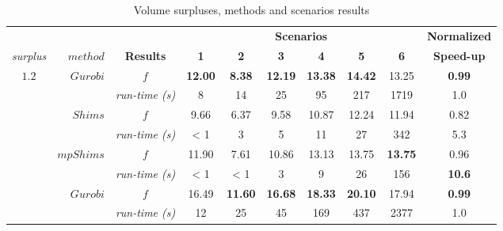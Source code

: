 \documentclass[preprint,authoryear]{elsarticle}
\begin{document}
\begin{table}[H]
\centering
\caption{Volume surpluses, methods and scenarios results}  \label{tab:results}
\footnotesize
\begin{tabular}{crcccccccc}
\toprule
&                          &                     &\multicolumn{6}{c}{\bf Scenarios}                                                                        &{\bf Normalized}\\
                                                 \cmidrule{4-9}		
{\it surplus}         & {$method$}               & {\bf Results}      &{\bf 1}      &{\bf 2}      &{\bf 3}      &{\bf 4}      &{\bf 5}       &{\bf 6}      &{\bf Speed-up} \\
\toprule


\multirow{7}{*}{$1.2$}&\multirow{2}{*}{ $Gurobi$}& $f$                & {\bf 12.00} & {\bf 8.38}  & {\bf 12.19} & {\bf 13.38} & {\bf 14.42} & 13.25        & {\bf 0.99} \\%
&                                                & {\it run-time (s)} &  8          &   14        &  25         &  95         &    217      &  1719        &  1.0       \\%

\cmidrule{2-10}		                       
&\multirow{2}{*}{ $Shims$}                       & $f$                & 9.66        &  6.37       &  9.58       &  10.87      &   12.24     & 11.94        &  0.82\\%
&                                                & {\it run-time (s)} &  < 1        &  3          &    5        &   11        &   27        & 342          &  5.3\\%

\cmidrule{2-10}		                       
&\multirow{2}{*}{ $mpShims$}                     & $f$                & 11.90       &  7.61       &  10.86      & 13.13       & 13.75       & {\bf 13.75}  &  0.96\\%
&                                                & {\it run-time (s)} &  < 1        &  < 1        &    3        &  9          &  26         & 156          &  {\bf 10.6}\\%

\midrule

\multirow{7}{*}{$1.5$}&\multirow{2}{*}{ $Gurobi$}& $f$                & 16.49       & {\bf 11.60} & {\bf 16.68} & {\bf 18.33} & {\bf 20.10} & 17.94        & {\bf 0.99}\\%
&                                                & {\it run-time (s)} &  12         &   25        &  45         &  169        &   437       &  2377        & 1.0\\%


\end{tabular}
\end{table}
\end{document}
